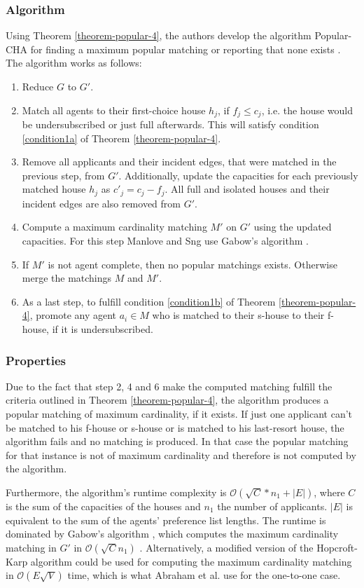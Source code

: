 \subsubsection{Algorithm}
Using Theorem \ref{theorem-popular-4}, the authors develop the algorithm Popular-CHA for finding a maximum popular matching or reporting that none exists \cite{ManlovePopularMatchings}. The algorithm works as follows:
\begin{enumerate}
    \item Reduce $G$ to $G'$.
    \item Match all agents to their first-choice house $h_j$, if $f_j \leq c_j$, i.e. the house would be undersubscribed or just full afterwards. This will satisfy condition \ref{condition1a} of Theorem \ref{theorem-popular-4}.
    \item Remove all applicants and their incident edges, that were matched in the previous step, from $G'$. Additionally, update the capacities for each previously matched house $h_j$ as $c'_j = c_j - f_j$. All full and isolated houses and their incident edges are also removed from $G'$.
    \item Compute a maximum cardinality matching $M'$ on $G'$ using the updated capacities. For this step Manlove and Sng use Gabow's algorithm \cite{Gabow1983}.
    \item If $M'$ is not agent complete, then no popular matchings exists. Otherwise merge the matchings $M$ and $M'$.
    \item As a last step, to fulfill condition \ref{condition1b} of Theorem \ref{theorem-popular-4}, promote any agent $a_i \in M$ who is matched to their s-house to their f-house, if it is undersubscribed. 
\end{enumerate}


\subsubsection{Properties}
Due to the fact that step 2, 4 and 6 make the computed matching fulfill the criteria outlined in Theorem \ref{theorem-popular-4}, the algorithm produces a popular matching of maximum cardinality, if it exists. If just one applicant can't be matched to his f-house or s-house or is matched to his last-resort house, the algorithm fails and no matching is produced. In that case the popular matching for that instance is not of maximum cardinality and therefore is not computed by the algorithm. 

Furthermore, the algorithm's runtime complexity is $\mathcal{O}(\sqrt{C} * n_1 + |E|)$, where $C$ is the sum of the capacities of the houses and $n_1$ the number of applicants. $|E|$ is equivalent to the sum of the agents' preference list lengths. The runtime is dominated by Gabow's algorithm \cite{Gabow1983}, which computes the maximum cardinality matching in $G'$ in $\mathcal{O}(\sqrt{C}n_1)$ \cite{ManlovePopularMatchings}. Alternatively, a modified version of the Hopcroft-Karp algorithm could be used for computing the maximum cardinality matching in $\mathcal{O}(E\sqrt{V})$\cite{Hopcroft} time, which is what Abraham et al. use for the one-to-one case.


